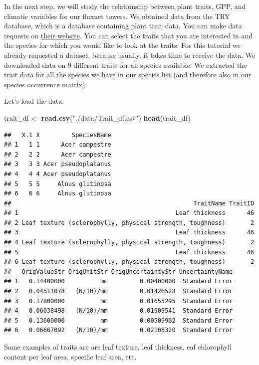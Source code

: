\documentclass[
]{book}
\newenvironment{Shaded}{\begin{snugshade}}{\end{snugshade}}
\newcommand{\KeywordTok}[1]{\textcolor[rgb]{0.13,0.29,0.53}{\textbf{#1}}}
\newcommand{\NormalTok}[1]{#1}
\newcommand{\StringTok}[1]{\textcolor[rgb]{0.31,0.60,0.02}{#1}}
\begin{document}
In the next step, we will study the relationship between plant traits, GPP, and climatic variables for our fluxnet towers. We obtained data from the TRY database, which is a database containing plant trait data. You can make data requests on \href{www.https://www.try-db.org}{their website}. You can select the traits that you are interested in and the species for which you would like to look at the traits.
For this tutorial we already requested a dataset, because usually, it takes time to receive the data. We downloaded data on 9 different traits for all species available. We extracted the trait data for all the species we have in our species list (and therefore also in our species occurrence matrix).

Let's load the data.

\begin{Shaded}
\begin{Highlighting}[]
\NormalTok{trait_df <-}\StringTok{ }\KeywordTok{read.csv}\NormalTok{(}\StringTok{"./data/Trait_df.csv"}\NormalTok{)}
\KeywordTok{head}\NormalTok{(trait_df)}
\end{Highlighting}
\end{Shaded}

\begin{verbatim}
##   X.1 X         SpeciesName
## 1   1 1      Acer campestre
## 2   2 2      Acer campestre
## 3   3 3 Acer pseudoplatanus
## 4   4 4 Acer pseudoplatanus
## 5   5 5     Alnus glutinosa
## 6   6 6     Alnus glutinosa
##                                                   TraitName TraitID
## 1                                            Leaf thickness      46
## 2 Leaf texture (sclerophylly, physical strength, toughness)       2
## 3                                            Leaf thickness      46
## 4 Leaf texture (sclerophylly, physical strength, toughness)       2
## 5                                            Leaf thickness      46
## 6 Leaf texture (sclerophylly, physical strength, toughness)       2
##   OrigValueStr OrigUnitStr OrigUncertaintyStr UncertaintyName
## 1   0.14400000          mm         0.00400000  Standard Error
## 2   0.04511078   (N/10)/mm         0.01426528  Standard Error
## 3   0.17800000          mm         0.01655295  Standard Error
## 4   0.06038498   (N/10)/mm         0.01909541  Standard Error
## 5   0.13600000          mm         0.00509902  Standard Error
## 6   0.06667092   (N/10)/mm         0.02108320  Standard Error
\end{verbatim}

Some examples of traits are are leaf texture, leaf thickness, eaf chlorophyll content per leaf area, specific leaf area, etc.
\end{document}
